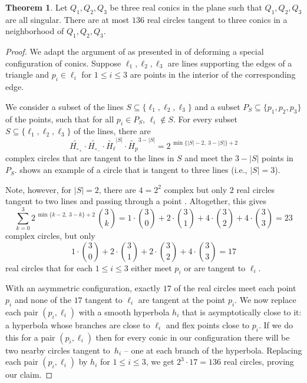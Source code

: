 \documentclass[12pt]{amsart}
\theoremstyle{definition}
\theoremstyle{definition}
\newtheorem{theorem}[thm]{Theorem}
\numberwithin{equation}{section}
\begin{document}
\begin{theorem}\label{thm:136_R}
Let $Q_1,Q_2,Q_3$ be three real conics in the plane such that $Q_1,Q_2,Q_3$ are all singular. There are at most $136$ real circles tangent to three conics in a neighborhood of $Q_1,Q_2,Q_3$. 
\end{theorem}
\begin{proof}
We adapt the argument of \cite{3264RealConics} as presented in \cite[Ch. 7]{RealSolutionsGeometry} of deforming a special configuration of conics. Suppose $\ell_{1},\ell_{2},\ell_{3}$ are lines supporting the edges of a triangle and $p_{i}\in\ell_{i}$ for $1\leq i\leq 3$ are points in the interior of the corresponding edge. 

We consider a subset of the lines $S \subseteq \{\ell_1,\ell_2,\ell_3 \}$ and a subset $P_S \subseteq \{p_1,p_2,p_3 \}$ of the points, such that for all $p_i \in P_S$, $\ell_i \not\in S$.
For every subset $S \subseteq \{ \ell_1, \ell_2, \ell_3 \}$ of the lines, there are 
$$\widetilde{H_{\circ_{+}}}\cdot\widetilde{H_{\circ_{-}}}\cdot\widetilde{H_{\ell}}^{|S|}\cdot\widetilde{H_{p}}^{3-|S|}=2^{\,\min\{|S|-2,\ 3-|S|\} + 2}$$
complex circles that are tangent to the lines in $S$ and meet the $3-|S|$ points in $P_S$.  shows an example of a circle that is tangent to three lines (i.e., $|S|=3$).

Note, however, for $|S|=2$, there are $4=2^2$ complex but only $2$ real circles tangent to two lines and passing through a point \cite{CirclesAndSpheres}. Altogether, this gives
$$\sum_{k=0}^{3}2^{\,\min\{k-2,\ 3-k\}+2}\,\binom{3}{k}=1\cdot\binom{3}{0}+2\cdot\binom{3}{1}+4\cdot\binom{3}{2}+4\cdot\binom{3}{3}=23$$
complex circles, but only 
$$1\cdot\binom{3}{0}+2\cdot\binom{3}{1}+2\cdot\binom{3}{2}+4\cdot\binom{3}{3}=17$$
real circles that for each $1\leq i\leq 3$ either meet $p_{i}$ or are tangent to $\ell_{i}$. 

With an asymmetric configuration, exactly $17$ of the real circles meet each point~$p_{i}$ and none of the $17$ tangent to $\ell_{i}$ are tangent at the point $p_{i}$. We now replace each pair $(p_{i},\ell_{i})$ with a smooth hyperbola $h_{i}$ that is asymptotically close to it: a hyperbola whose branches are close to $\ell_{i}$ and flex points close to $p_{i}$. 
If we do this for a pair $(p_{i},\ell_{i})$ then for every conic in our configuration there will be two nearby circles tangent to~$h_{i}$ -- one at each branch of the hyperbola. Replacing each pair $(p_{i},\ell_{i})$ by $h_i$ for $1\leq i\leq 3$, we get $2^{3}\cdot17=136$ real circles, proving our claim. 
\end{proof}
\end{document}
